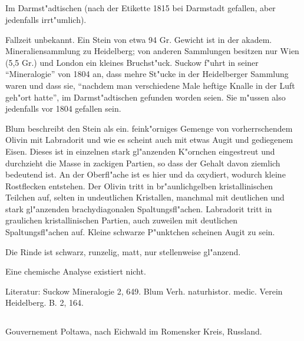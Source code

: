 \documentclass[a4paper, 11pt, oneside]{article}
\begin{document}
\subsection{}
\LARGE
\paragraph{}
Im Darmst"adtischen (nach der Etikette 1815 bei Darmstadt gefallen, aber jedenfalls irrt"umlich).

Fallzeit unbekannt. Ein Stein von etwa 94 Gr. Gewicht ist in der akadem. Mineraliensammlung zu Heidelberg; von anderen Sammlungen besitzen nur Wien (5,5 Gr.) und London ein kleines Bruchst"uck. Suckow f"uhrt in seiner "`Mineralogie"' von 1804 an, dass mehre St"ucke in der Heidelberger Sammlung waren und dass sie, "`nachdem man verschiedene Male heftige Knalle in der Luft geh"ort hatte"', im Darmst"adtischen gefunden worden seien. Sie m"ussen also jedenfalls vor 1804 gefallen sein.

Blum beschreibt den Stein als ein. feink"orniges Gemenge von vorherrschendem Olivin mit Labradorit und wie es scheint auch mit etwas Augit und gediegenem Eisen. Dieses ist in einzelnen stark gl"anzenden K"ornchen eingestreut und durchzieht die Masse in zackigen Partien, so dass der Gehalt davon ziemlich bedeutend ist. An der Oberfl"ache ist es hier und da oxydiert, wodurch kleine Rostflecken entstehen. Der Olivin tritt in br"aunlichgelben kristallinischen Teilchen auf, selten in undeutlichen Kristallen, manchmal mit deutlichen und stark gl"anzenden brachydiagonalen Spaltungsfl"achen. Labradorit tritt in graulichen kristallinischen Partien, auch zuweilen mit deutlichen Spaltungsfl"achen auf. Kleine schwarze P"unktchen scheinen Augit zu sein.

Die Rinde ist schwarz, runzelig, matt, nur stellenweise gl"anzend.

Eine chemische Analyse existiert nicht.

\normalsize
Literatur: Suckow Mineralogie 2, 649. Blum Verh. naturhistor. medic. Verein Heidelberg. B. 2, 164.

\subsection{}
\LARGE
\paragraph{}
Gouvernement Poltawa, nach Eichwald im Romensker Kreis, Russland.
\end{document}
